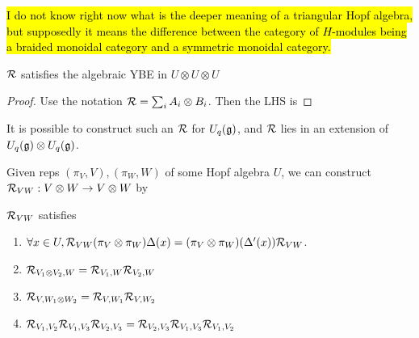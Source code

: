 \documentclass{article}
\begin{document}
\begin{remark}
\hl{I do not know right now what is the deeper meaning of a triangular Hopf algebra, but supposedly it means the difference between the category of $H$-modules being a braided monoidal category and a symmetric monoidal category. }
\end{remark}


\begin{prop}
$\mathcal{R}$ satisfies the algebraic YBE in $U \otimes U \otimes U$
\end{prop}
\begin{proof}
Use the notation $\mathcal{R} = \sum_i A_i \otimes B_i$. Then the LHS is 
\end{proof}

\begin{theorem}
It is possible to construct such an $\mathcal{R}$ for $U_q(\mathfrak{g})$, and $\mathcal{R}$ lies in an extension of $U_q(\mathfrak{g}) \otimes U_q(\mathfrak{g})$. 
\end{theorem}

Given reps $(\pi_V,V), (\pi_W,W)$ of some Hopf algebra $U$, we can construct $\mathcal{R}_{VW}  : V \otimes W \to V \otimes W $ by 
\begin{prop}
$\mathcal{R}_{VW}$ satisfies 
\begin{enumerate}
    \item $\forall x \in U, \mathcal{R}_{VW}(\pi_V \otimes \pi_W) \Delta(x) = (\pi_V \otimes \pi_W) (\Delta^\prime(x)) \mathcal{R}_{VW}$.
    \item $\mathcal{R}_{V_1 \otimes V_2,W} = \mathcal{R}_{V_1 ,W}\mathcal{R}_{V_2,W}$
    \item $\mathcal{R}_{V,W_1 \otimes W_2} = \mathcal{R}_{V,W_1} \mathcal{R}_{V,W_2}$
    \item $\mathcal{R}_{V_1,V_2}\mathcal{R}_{V_1,V_3} \mathcal{R}_{V_2,V_3} = \mathcal{R}_{V_2,V_3} \mathcal{R}_{V_1,V_3} \mathcal{R}_{V_1,V_2}$
\end{enumerate}
\end{prop}
\end{document}
